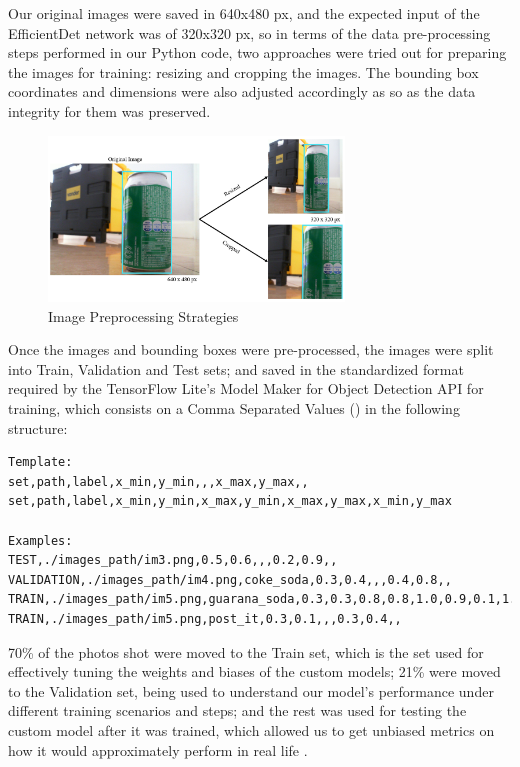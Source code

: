 \documentclass[openright]{normas-utf-tex} %
\begin{document}
Our original images were saved in 640x480 px, and the expected input of the EfficientDet network 
was of 320x320 px, so in terms of the data pre-processing steps performed in our Python code, two approaches were
tried out for preparing the images for training: resizing and cropping the images. 
The bounding box coordinates and dimensions were also adjusted accordingly as so as the data 
integrity for them was preserved. 

\begin{figure}[H]
	\centering
	\includegraphics[width=0.7\textwidth]{./images/image_preprocessing.png}
	\caption[Image Preprocessing Strategies]{Image Preprocessing Strategies}
\end{figure}

Once the images and bounding boxes were pre-processed, the images were split into Train, Validation 
and Test sets; and saved in the standardized format required by the TensorFlow Lite's Model Maker for Object Detection API for training,
which consists on a Comma Separated Values () in the following
structure:

\begin{lstlisting}[caption={CSV format for specifying the Train, Test and Validation 
	image sets for training models using the TensorFlow's Model Maker API for Object 
	Detection},label={lst:csvFormatTrain}]
Template:
set,path,label,x_min,y_min,,,x_max,y_max,,
set,path,label,x_min,y_min,x_max,y_min,x_max,y_max,x_min,y_max

Examples:
TEST,./images_path/im3.png,0.5,0.6,,,0.2,0.9,,
VALIDATION,./images_path/im4.png,coke_soda,0.3,0.4,,,0.4,0.8,,
TRAIN,./images_path/im5.png,guarana_soda,0.3,0.3,0.8,0.8,1.0,0.9,0.1,1.0
TRAIN,./images_path/im5.png,post_it,0.3,0.1,,,0.3,0.4,,
\end{lstlisting}

70\% of the photos shot were moved to the Train set, which is the set used for effectively 
tuning the weights and biases of the custom models; 21\% were moved to the Validation set, 
being used to understand our model's performance under different training scenarios and steps; 
and the rest was used for testing the custom model after it was trained, which allowed us to 
get unbiased metrics on how it would approximately perform in real life \cite{MluExplain}.
\end{document}
